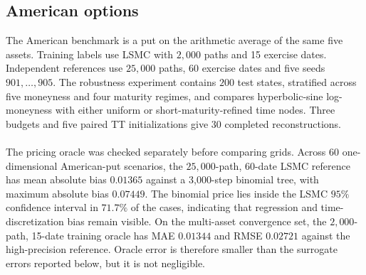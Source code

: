 \documentclass{article}
\numberwithin{equation}{subsection}
\theoremstyle{definition}
\theoremstyle{remark}
\begin{document}
\subsection{American options}
\label{subsec:american-results}
The American benchmark is a put on the arithmetic average of the same five
assets. Training labels use LSMC with \(2{,}000\) paths and 15 exercise dates.
Independent references use \(25{,}000\) paths, 60 exercise dates and five seeds
\(901,\ldots,905\). The robustness experiment contains \(200\) test states,
stratified across five moneyness and four maturity regimes, and compares
hyperbolic-sine log-moneyness with either uniform or short-maturity-refined
time nodes. Three budgets and five paired TT initializations give 30 completed
reconstructions. \\
\\
The pricing oracle was checked separately before comparing grids. Across 60
one-dimensional American-put scenarios, the \(25{,}000\)-path, 60-date LSMC
reference has mean absolute bias \(0.01365\) against a 3,000-step binomial tree,
with maximum absolute bias \(0.07449\). The binomial price lies inside the LSMC
\(95\%\) confidence interval in \(71.7\%\) of the cases, indicating that
regression and time-discretization bias remain visible. On the multi-asset
convergence set, the \(2{,}000\)-path, 15-date training oracle has MAE
\(0.01344\) and RMSE \(0.02721\) against the high-precision reference. Oracle
error is therefore smaller than the surrogate errors reported below, but it is
not negligible.
\begin{table}[H]
    \centering
    \caption{American arithmetic-basket put robustness results. Entries are
    means and standard deviations across five paired TT initializations.
    Adaptive wins count the seeds for which short-maturity refinement lowers
    the MAE relative to uniform maturity at the same budget.}
    \label{tab:american-grid-results}
\end{table}
\end{document}
